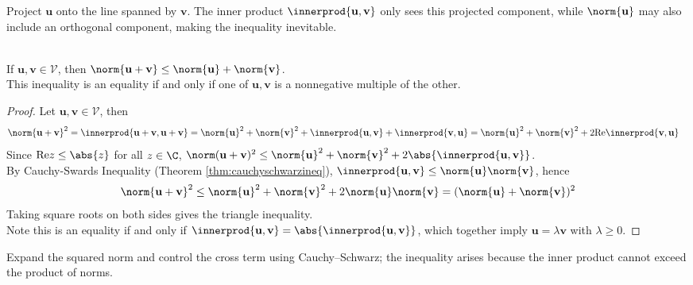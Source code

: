 Project $\mathbf{u}$ onto the line spanned by $\mathbf{v}$. The inner product $\innerprod{\mathbf{u}, \mathbf{v}}$ only sees this projected component, while $\norm{\mathbf{u}}$ may also include an orthogonal component, making the inequality inevitable.

\begin{theorem} \label{thm:triangleineq} \\
If $\mathbf{u}, \mathbf{v} \in \mathcal{V}$, then $\norm{\mathbf{u} + \mathbf{v}} \leq \norm{\mathbf{u}} + \norm{\mathbf{v}}$.\\
This inequality is an equality if and only if one of $\mathbf{u}, \mathbf{v}$ is a nonnegative multiple of the other.
\begin{proof} Let $\mathbf{u}, \mathbf{v} \in \mathcal{V}$, then
\begin{align}
\norm{\mathbf{u} + \mathbf{v}}^2 &= \innerprod{\mathbf{u} + \mathbf{v}, \mathbf{u} + \mathbf{v}} = \norm{\mathbf{u}}^2 + \norm{\mathbf{v}}^2 + \innerprod{\mathbf{u}, \mathbf{v}} + \innerprod{\mathbf{v}, \mathbf{u}} = \norm{\mathbf{u}}^2 + \norm{\mathbf{v}}^2 + 2 \text{Re}\innerprod{\mathbf{v}, \mathbf{u}} \nonumber
\end{align}
Since $\text{Re} z \leq \abs{z}$ for all $z \in \C$, $\norm(\mathbf{u} + \mathbf{v})^2 \leq \norm{\mathbf{u}}^2 + \norm{\mathbf{v}}^2 + 2\abs{\innerprod{\mathbf{u}, \mathbf{v}}}$.\\
By Cauchy-Swards Inequality (Theorem \ref{thm:cauchyschwarzineq}), $\innerprod{\mathbf{u}, \mathbf{v}} \leq \norm{\mathbf{u}}\norm{\mathbf{v}}$, hence
\begin{align}
\norm{\mathbf{u} + \mathbf{v}}^2 \leq \norm{\mathbf{u}}^2 + \norm{\mathbf{v}}^2 + 2 \norm{\mathbf{u}} \norm{\mathbf{v}} = (\norm{\mathbf{u}} + \norm{\mathbf{v}})^2 \nonumber
\end{align}
Taking square roots on both sides gives the triangle inequality.\\
Note this is an equality if and only if $\innerprod{\mathbf{u}, \mathbf{v}} = \abs{\innerprod{\mathbf{u}, \mathbf{v}}}$, which together imply $\mathbf{u} = \lambda \mathbf{v}$ with $\lambda \geq 0$.
\end{proof}
\end{theorem}

Expand the squared norm and control the cross term using Cauchy–Schwarz; the inequality arises because the inner product cannot exceed the product of norms.

